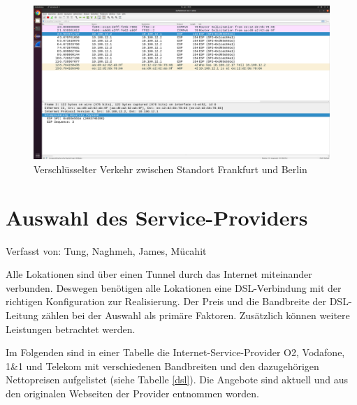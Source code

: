 \documentclass[fontsize=12pt,paper=a4,open=any,parskip=half,
  twoside=false,toc=listof,toc=bibliography,fleqn,leqno,
  captions=nooneline,captions=tableabove,british]{scrbook}
\begin{document}
\begin{figure}[H]
 \centering
 \includegraphics[width=1.0\textwidth]{Bilder/esp}
 \captionsetup{justification=centering}
 \caption{Verschlüsselter Verkehr zwischen Standort Frankfurt und Berlin}
 \label{esp}
\end{figure}


\section{Auswahl des Service-Providers}
{\tiny Verfasst von: Tung, Naghmeh, James, Mücahit\par}
Alle Lokationen sind über einen Tunnel durch das Internet miteinander verbunden. Deswegen benötigen alle Lokationen eine DSL-Verbindung mit der richtigen Konfiguration zur Realisierung. Der Preis und die Bandbreite der DSL-Leitung zählen bei der Auswahl als primäre Faktoren. Zusätzlich können weitere Leistungen betrachtet werden.\par 
Im Folgenden sind in einer Tabelle die Internet-Service-Provider O2, Vodafone, 1\&1 und Telekom mit verschiedenen Bandbreiten und den dazugehörigen Nettopreisen aufgelistet \cite{o2} \cite{vodafone} \cite{1u1} \cite{telekom} (siehe Tabelle \ref{dsl}). Die Angebote sind aktuell und aus den originalen Webseiten der Provider entnommen worden.
\end{document}
